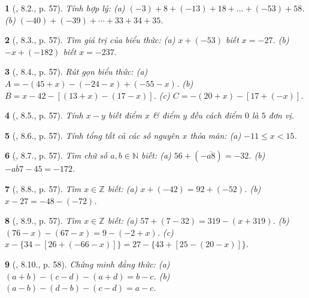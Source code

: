 \documentclass{article}
\newtheorem{baitoan}{}
\begin{document}
\begin{baitoan}[\cite{Binh_boi_duong_Toan_6_tap_1}, 8.2., p. 57]
	Tính hợp lý: (a) $(-3) + 8 + (-13) + 18 + \ldots + (-53) + 58$. (b) $(-40) + (-39) + \cdots + 33 + 34 + 35$.
\end{baitoan}

\begin{baitoan}[\cite{Binh_boi_duong_Toan_6_tap_1}, 8.3., p. 57]
	Tìm giá trị của biểu thức: (a) $x + (-53)$ biết $x = -27$. (b) $-x + (-182)$ biết $x = -237$.
\end{baitoan}

\begin{baitoan}[\cite{Binh_boi_duong_Toan_6_tap_1}, 8.4., p. 57]
	Rút gọn biểu thức: (a) $A = -(45 + x) - (-24 - x) + (-55 - x)$. (b) $B = x - 42 - [(13 + x) - (17 - x)]$. (c) $C = -(20 + x) - [17 + (-x)]$.
\end{baitoan}

\begin{baitoan}[\cite{Binh_boi_duong_Toan_6_tap_1}, 8.5., p. 57]
	Tính $x - y$ biết điểm $x$ \& điểm $y$ đều cách điểm $0$ là $5$ đơn vị.
\end{baitoan}

\begin{baitoan}[\cite{Binh_boi_duong_Toan_6_tap_1}, 8.6., p. 57]
	Tính tổng tất cả các số nguyên $x$ thỏa mãn: (a) $-11\le x < 15$.
\end{baitoan}

\begin{baitoan}[\cite{Binh_boi_duong_Toan_6_tap_1}, 8.7., p. 57]
	Tìm chữ số $a,b\in\mathbb{N}$ biết: (a) $56 + (-\overline{a8}) = -32$. (b) $-\overline{ab7} - 45 = -172$.
\end{baitoan}

\begin{baitoan}[\cite{Binh_boi_duong_Toan_6_tap_1}, 8.8., p. 57]
	Tìm $x\in\mathbb{Z}$ biết: (a) $x + (-42) = 92 + (-52)$. (b) $x - 27 = -48 - (-72)$.
\end{baitoan}

\begin{baitoan}[\cite{Binh_boi_duong_Toan_6_tap_1}, 8.9., p. 57]
	Tìm $x\in\mathbb{Z}$ biết: (a) $57 + (7 - 32) = 319 - (x + 319)$. (b) $(76 - x) - (67 - x) = 9 - (-2 + x)$. (c) $x - \{34 - [26 + (-66 - x)]\} = 27 - \{43 + [25 - (20 - x)]\}$.
\end{baitoan}

\begin{baitoan}[\cite{Binh_boi_duong_Toan_6_tap_1}, 8.10., p. 58]
	Chứng minh đẳng thức: (a) $(a + b) - (c - d) - (a + d) = b - c$. (b) $(a - b) - (d - b) - (c - d) = a - c$.
\end{baitoan}
\end{document}
